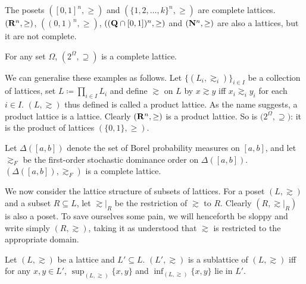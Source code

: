 \documentclass[11pt,letterpaper,reqno,oneside]{article}
\begin{document}
\begin{example}
	The posets $\left([0,1]^n,\geq\right)$ and $(\{1,2,\dots,k\}^n,\geq)$ are complete lattices. $\left(\mathbf{R}^n,\geq\right)$, $\left((0,1)^n,\geq\right)$, $((\mathbf{Q} \cap [0,1])^n,\geq)$ and $\left(\mathbf{N}^n,\geq\right)$ are also a lattices, but it are not complete.
\end{example}

\begin{example}
	For any set $\Omega$, $\left( 2^\Omega, \supseteq \right)$ is a complete lattice.
\end{example}

We can generalise these examples as follows. Let $\{ (L_i,\gtrsim_i) \}_{i \in I}$ be a collection of lattices, set $L \coloneqq \prod_{i \in I} L_i$ and define $\gtrsim$ on $L$ by $x \gtrsim y$ iff $x_i \gtrsim_i y_i$ for each $i \in I$. $(L,\gtrsim)$ thus defined is called a product lattice. As the name suggests, a product lattice is a lattice. Clearly $\left(\mathbf{R}^n,\geq\right)$ is a product lattice. So is $\bigl( 2^\Omega, \supseteq \bigr)$: it is the product of lattices $(\{0,1\},\geq)$.

\begin{example}
	Let $\Delta([a,b])$ denote the set of Borel probability measures on $[a,b]$, and let $\gtrsim_F$ be the first-order stochastic dominance order on $\Delta([a,b])$. $\left( \Delta([a,b]), \gtrsim_F \right)$ is a complete lattice.
\end{example}


We now consider the lattice structure of subsets of lattices. For a poset $(L,\gtrsim)$ and a subset $R \subseteq L$, let $\gtrsim|_R$ be the restriction of $\gtrsim$ to $R$. Clearly $(R,\gtrsim|_R)$ is also a poset. To save ourselves some pain, we will henceforth be sloppy and write simply $(R,\gtrsim)$, taking it as understood that $\gtrsim$ is restricted to the appropriate domain.
%
\begin{definition}
	Let $(L,\gtrsim)$ be a lattice and $L' \subseteq L$. $(L',\gtrsim)$ is a sublattice of $(L,\gtrsim)$ iff for any $x,y \in L'$, $\sup_{(L,\gtrsim)}\{x,y\}$ and $\inf_{(L,\gtrsim)}\{x,y\}$ lie in $L'$.
\end{definition}
\end{document}
